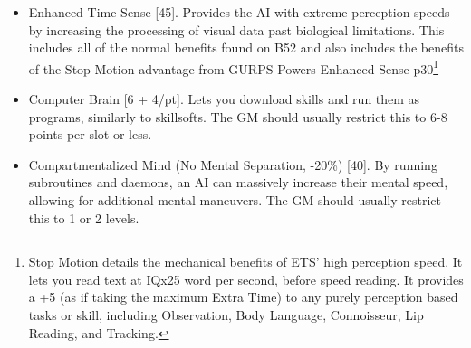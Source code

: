 \begin{multicols*}{3}
	\begin{itemize}
		\itemsep 0pt
		\item Enhanced Time Sense [45]. Provides the AI with extreme perception speeds by increasing the processing of visual data past biological limitations. This includes all of the normal benefits found on B52 and also includes the benefits of the Stop Motion advantage from GURPS Powers Enhanced Sense p30\footnote{Stop Motion details the mechanical benefits of ETS' high perception speed. It lets you read text at IQx25 word per second, before speed reading. It provides a +5 (as if taking the maximum Extra Time) to any purely perception based tasks or skill, including Observation, Body Language, Connoisseur, Lip Reading, and Tracking.}
		\item Computer Brain [6 + 4/pt]. Lets you download skills and run them as programs, similarly to skillsofts. The GM should usually restrict this to 6-8 points per slot or less.
		\item Compartmentalized Mind (No Mental Separation, -20\%) [40]. By running subroutines and daemons, an AI can massively increase their mental speed, allowing for additional mental maneuvers. The GM should usually restrict this to 1 or 2 levels.
	\end{itemize}
	

\end{multicols*}
